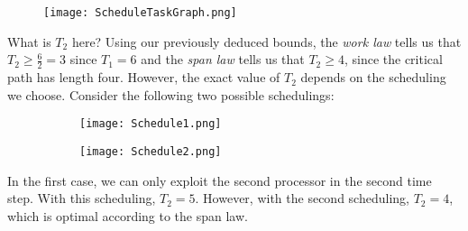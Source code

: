 \documentclass[main.tex]{subfiles}
\begin{document}
\begin{figure}[H]
    \centering
    \texttt{[image: ScheduleTaskGraph.png]}
\end{figure}

\noindent What is \(T_{2}\) here? Using our previously deduced bounds, the \textit{work law} tells us that \(T_{2}\geq \frac{6}{2}=3\) since \(T_{1}=6\) and the \textit{span law} tells us that \(T_{2}\geq 4\), since the critical path has length four. However, the exact value of \(T_{2}\) depends on the scheduling we choose. Consider the following two possible schedulings:

\begin{figure}[H]
    \begin{subfigure}[t]{.5\textwidth}
        \centering
        \texttt{[image: Schedule1.png]}
    \end{subfigure}
    \begin{subfigure}[t]{.5\textwidth}
        \centering
        \texttt{[image: Schedule2.png]}
    \end{subfigure}
\end{figure}

\noindent In the first case, we can only exploit the second processor in the second time step. With this scheduling, \(T_{2}=5\). However, with the second scheduling, \(T_{2}=4\), which is optimal according to the span law.
\end{document}
